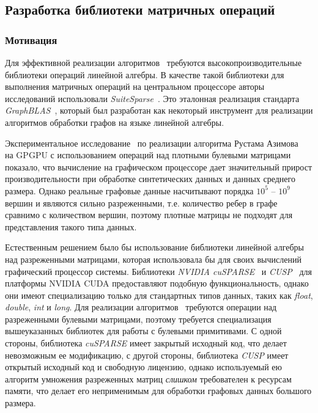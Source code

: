
\subsection{Разработка библиотеки матричных операций}
 
\subsubsection{Мотивация}

Для эффективной реализации алгоритмов~\cite{inbook:kronecker_cfpq_adbis, inproceedings:matrix_cfpq} требуются высокопроизводительные библиотеки операций линейной алгебры. В качестве такой библиотеки для выполнения матричных операций на центральном процессоре авторы исследований использовали \textit{SuiteSparse}~\cite{net:suite_sparse}. Это эталонная реализация стандарта \textit{GraphBLAS}~\cite{net:graphblas}, который был разработан как некоторый инструмент для реализации алгоритмов обработки графов на языке линейной алгебры.  

Экспериментальное исследование~\cite{inproceedings:cfpq_matrix_evaluation} по реализации алгоритма Рустама Азимова~\cite{inproceedings:matrix_cfpq} на GPGPU с использованием операций над плотными булевыми матрицами показало, что вычисление на графическом процессоре дает значительный прирост производительности при обработке синтетических данных и данных среднего размера. Однако реальные графовые данные насчитывают порядка $10^5$ -- $10^9$ вершин и являются сильно разреженными, т.е. количество ребер в графе сравнимо с количеством вершин, поэтому плотные матрицы не подходят для представления такого типа данных. 

Естественным решением было бы использование библиотеки линейной алгебры над разреженными матрицами, которая использовала бы для своих вычислений графический процессор системы. Библиотеки \textit{NVIDIA cuSPARSE}~\cite{net:cusparse_docs} и \textit{CUSP}~\cite{net:cusplibrary} для платформы NVIDIA CUDA предоставляют подобную функциональность, однако они имеют специализацию только для стандартных типов данных, таких как \textit{float}, \textit{double}, \textit{int} и \textit{long}. Для реализации алгоритмов~\cite{inbook:kronecker_cfpq_adbis, inproceedings:matrix_cfpq} требуются операции над разреженными булевыми матрицами, поэтому требуется специализация вышеуказанных библиотек для работы с булевыми примитивами. С одной стороны, библиотека \textit{cuSPARSE} имеет закрытый исходный код, что делает невозможным ее модификацию, с другой стороны, библиотека \textit{CUSP} имеет открытый исходный код и свободную лицензию, однако используемый ею алгоритм умножения разреженных матриц \textit{слишком} требователен к ресурсам памяти, что делает его неприменимым для обработки графовых данных большого размера.

